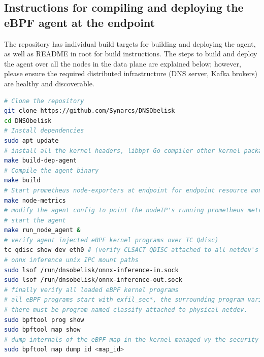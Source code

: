 \documentclass [11pt, proquest] {uwthesis}[2020/02/24]
\begin{document}
\subsection{Instructions for compiling and deploying the eBPF agent at the endpoint}
The repository has individual build targets for building and deploying the agent, as well as README in root for build instructions. The steps to build and deploy the agent over all the nodes in the data plane are explained below; however, please ensure the required distributed infrastructure (DNS server, Kafka brokers) are healthy and discoverable.

{\footnotesize
\begin{lstlisting}[language=bash, 
    caption={Installation steps for eBPF agent at endpoint in data plane}, 
    label={lst:install-steps-dp},
    aboveskip=0.5em, 
    belowskip=0.5em
]
# Clone the repository
git clone https://github.com/Synarcs/DNSObelisk
cd DNSObelisk
# Install dependencies
sudo apt update 
# install all the kernel headers, libbpf Go compiler other kernel packages and userspace packages.
make build-dep-agent 
# Compile the agent binary 
make build 
# Start prometheus node-exporters at endpoint for endpoint resource monitoring 
make node-metrics
# modify the agent config to point the nodeIP's running prometheus metric server, kafka brokers, grafana visualization server (node_agent/config.yaml).
# start the agent
make run_node_agent &
# verify agent injected eBPF kernel programs over TC Qdisc)
tc qdisc show dev eth0 # (verify CLSACT QDISC attached to all netdev's and bridge interfaces).
# onnx inference unix IPC mount paths 
sudo lsof /run/dnsobelisk/onnx-inference-in.sock  
sudo lsof /run/dnsobelisk/onnx-inference-out.sock
# finally verify all loaded eBPF kernel programs 
# all eBPF programs start with exfil_sec*, the surrounding program varies based on number of netdev's
# there must be program named classify attached to physical netdev.
sudo bpftool prog show  
sudo bpftool map show
# dump internals of the eBPF map in the kernel managed vy the security framework 
sudo bpftool map dump id <map_id>
\end{lstlisting}
}


\end{document}
